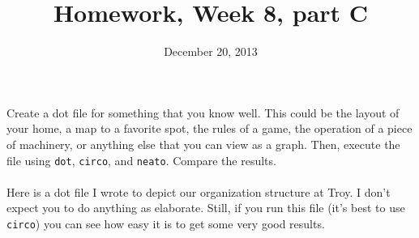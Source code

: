 \documentclass{article}
\title{Homework, Week 8, part C}
\date{December 20, 2013}
\begin{document}
\maketitle{}

\paragraph{}Create a dot file for something that you know well. This could be the layout of your home, a map to a favorite spot, the rules of a game, the operation of a piece of machinery, or anything else that you can view as a graph. Then, execute the file using  \texttt{dot}, \texttt{circo}, and \texttt{neato}. Compare the results.

\paragraph{}Here is a dot file I wrote to depict our organization structure at Troy. I don't expect you to do anything as elaborate. Still, if you run this file (it's best to use \texttt{circo}) you can see how easy it is to get some very good results.
\end{document}
